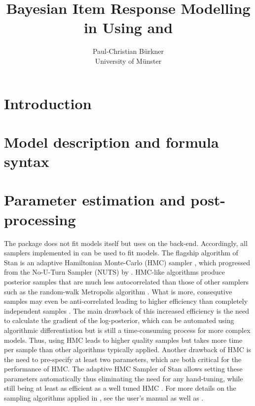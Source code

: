 \documentclass[article]{jss}
\author{
Paul-Christian Bürkner\\University of Münster
}
\title{Bayesian Item Response Modelling in \proglang{R} Using \pkg{brms} and
\proglang{Stan}}
\begin{document}
\hypertarget{introduction}{%
\section{Introduction}\label{introduction}}

\hypertarget{model-description-and-formula-syntax}{%
\section{Model description and formula
syntax}\label{model-description-and-formula-syntax}}

\hypertarget{parameter-estimation-and-post-processing}{%
\section{Parameter estimation and
post-processing}\label{parameter-estimation-and-post-processing}}

The  package does not fit models itself but uses 
\citep{carpenter2017} on the back-end. Accordingly, all samplers
implemented in  can be used to fit  models. The
flagship algorithm of Stan is an adaptive Hamiltonian Monte-Carlo (HMC)
sampler \citep{betancourt2014, betancourt2017, stanM2019}, which
progressed from the No-U-Turn Sampler (NUTS) by \cite{hoffman2014}.
HMC-like algorithms produce posterior samples that are much less
autocorrelated than those of other samplers such as the random-walk
Metropolis algorithm \citep{hoffman2014, creutz1988}. What is more,
consequtive samples may even be anti-correlated leading to higher
efficiency than completely independent samples \citep{gelman2014}. The
main drawback of this increased efficiency is the need to calculate the
gradient of the log-posterior, which can be automated using algorithmic
differentiation \citep{griewank2008} but is still a time-consuming
process for more complex models. Thus, using HMC leads to higher quality
samples but takes more time per sample than other algorithms typically
applied. Another drawback of HMC is the need to pre-specify at least two
parameters, which are both critical for the performance of HMC. The
adaptive HMC Sampler of Stan allows setting these parameters
automatically thus eliminating the need for any hand-tuning, while still
being at least as efficient as a well tuned HMC \citep{hoffman2014}. For
more details on the sampling algorithms applied in , see the
 user's manual \citep{stanM2019} as well as
\cite{hoffman2014}.
\end{document}
